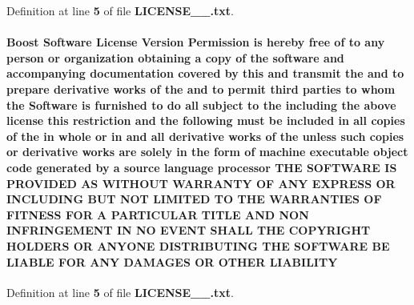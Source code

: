 Definition at line {\bf 5} of file {\bf L\+I\+C\+E\+N\+S\+E\+\_\+\_.\+txt}.

\paragraph[{L\+I\+A\+B\+I\+L\+I\+TY}]{\setlength{\rightskip}{0pt plus 5cm}Boost {\bf Software} License Version Permission is hereby free of to any person or organization obtaining a copy of the software and accompanying documentation covered by this and transmit the and to prepare derivative works of the and to permit third parties to whom the {\bf Software} is furnished to do {\bf all} subject to the including the above {\bf license} this restriction and the {\bf following} must be included in {\bf all} copies of the in whole or in and {\bf all} derivative works of the unless such copies or derivative works are solely in the form of machine executable object code generated by a source language processor T\+HE S\+O\+F\+T\+W\+A\+RE {\bf IS} P\+R\+O\+V\+I\+D\+ED AS W\+I\+T\+H\+O\+UT W\+A\+R\+R\+A\+N\+TY OF A\+NY E\+X\+P\+R\+E\+SS OR I\+N\+C\+L\+U\+D\+I\+NG B\+UT N\+OT L\+I\+M\+I\+T\+ED TO T\+HE W\+A\+R\+R\+A\+N\+T\+I\+ES OF F\+I\+T\+N\+E\+SS F\+OR A P\+A\+R\+T\+I\+C\+U\+L\+AR T\+I\+T\+LE A\+ND N\+ON I\+N\+F\+R\+I\+N\+G\+E\+M\+E\+NT IN NO E\+V\+E\+NT S\+H\+A\+LL T\+HE C\+O\+P\+Y\+R\+I\+G\+HT H\+O\+L\+D\+E\+RS OR A\+N\+Y\+O\+NE D\+I\+S\+T\+R\+I\+B\+U\+T\+I\+NG T\+HE S\+O\+F\+T\+W\+A\+RE BE L\+I\+A\+B\+LE F\+OR A\+NY D\+A\+M\+A\+G\+ES OR O\+T\+H\+ER L\+I\+A\+B\+I\+L\+I\+TY}\label{LICENSE__1__0_8txt_a155dc6a50ea691e50dfeb8129f3c12b4}


Definition at line {\bf 5} of file {\bf L\+I\+C\+E\+N\+S\+E\+\_\+\_.\+txt}.


